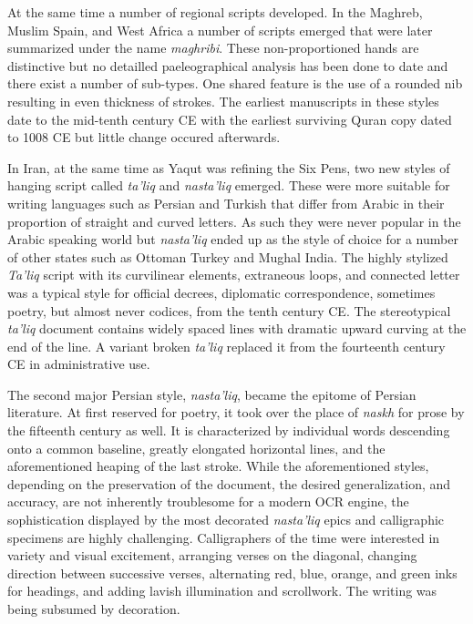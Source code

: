 At the same time a number of regional scripts developed. In the Maghreb, Muslim
Spain, and West Africa a number of scripts emerged that were later summarized
under the name \emph{maghribi}. These non-proportioned  hands are distinctive
but no detailled paeleographical analysis has been done to date and there exist
a number of sub-types. One shared feature is the use of a rounded nib resulting
in even thickness of strokes\cite[pg. 147-148]{gacek2009arabic}.  The earliest
manuscripts in these styles date to the mid-tenth century CE with the earliest
surviving Quran copy dated to 1008 CE but little change occured
afterwards\cite[pg. 566]{blair2006islamic}.

In Iran, at the same time as Yaqut was refining the Six Pens, two new styles of
hanging script called \emph{ta'liq} and \emph{nasta'liq} emerged. These were
more suitable for writing languages such as Persian and Turkish that differ
from Arabic in their proportion of straight and curved letters. As such they
were never popular in the Arabic speaking world but \emph{nasta'liq} ended up
as the style of choice for a number of other states such as Ottoman Turkey and
Mughal India. The highly stylized \emph{Ta'liq} script with its curvilinear
elements, extraneous loops, and connected letter was a typical style for
official decrees, diplomatic correspondence, sometimes poetry, but almost never
codices, from the tenth century CE. The stereotypical \emph{ta'liq} document
contains widely spaced lines with dramatic upward curving at the end of the
line. A variant broken \emph{ta'liq} replaced it from the fourteenth century CE
in administrative use\cite[pg. 270-273]{blair2006islamic}.

The second major Persian style, \emph{nasta'liq}, became the epitome of Persian
literature. At first reserved for poetry, it took over the place of
\emph{naskh} for prose by the fifteenth century as well. It is characterized by
individual words descending onto a common baseline, greatly elongated
horizontal lines, and the aforementioned heaping of the last stroke\cite[pg.
166-167]{gacek2009arabic}. While the aforementioned styles, depending on the
preservation of the document, the desired generalization, and accuracy, are not
inherently troublesome for a modern OCR engine, the sophistication displayed by
the most decorated \emph{nasta'liq} epics and calligraphic specimens are highly
challenging. Calligraphers of the time were interested in variety and visual
excitement, arranging verses on the diagonal, changing direction between
successive verses, alternating red, blue, orange, and green inks for headings,
and adding lavish illumination and scrollwork. The writing was being subsumed
by decoration\cite[pg. 436]{blair2006islamic}. 

